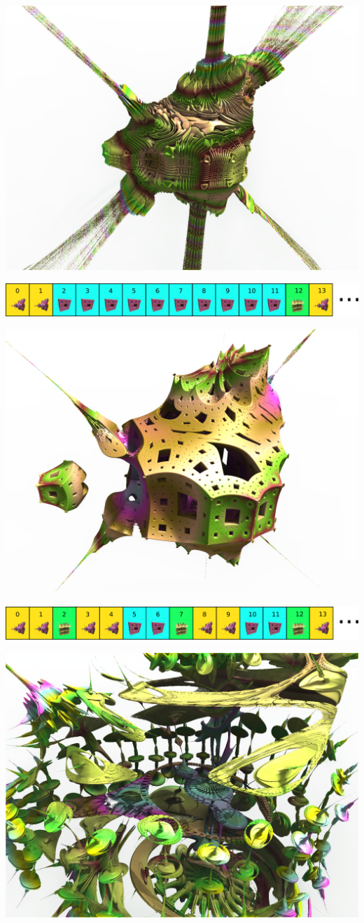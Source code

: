 \includegraphics[width=0.7\linewidth]{img/manual/media/hybrid_sequence_example_2.png}

\includegraphics[width=\linewidth]{img/manual/media/iteration_loop_hybrid_sequence_3.png}

\includegraphics[width=0.7\linewidth]{img/manual/media/hybrid_sequence_example_3.png}

\includegraphics[width=\linewidth]{img/manual/media/iteration_loop_hybrid_sequence_4.png}

\includegraphics[width=0.7\linewidth]{img/manual/media/hybrid_sequence_example_4.png}

